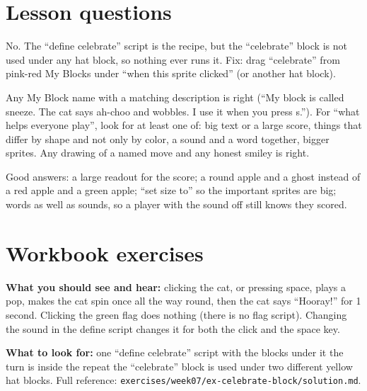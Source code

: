 
\section{Lesson questions}
\begin{answer}
No. The \enquote{define celebrate} script is the recipe, but the \enquote{celebrate} block is not used under any hat block, so nothing ever runs it. Fix: drag \enquote{celebrate} from pink-red My Blocks under \enquote{when this sprite clicked} (or another hat block).
\end{answer}

\begin{answer}[Reflection]
Any My Block name with a matching description is right (\enquote{My block is called sneeze. The cat says ah-choo and wobbles. I use it when you press s.}). For \enquote{what helps everyone play}, look for at least one of: big text or a large score, things that differ by shape and not only by color, a sound and a word together, bigger sprites. Any drawing of a named move and any honest smiley is right.
\end{answer}

\begin{answer}
Good answers: a large readout for the score; a round apple and a ghost instead of a red apple and a green apple; \enquote{set size to} so the important sprites are big; words as well as sounds, so a player with the sound off still knows they scored.
\end{answer}

\section{Workbook exercises}
\begin{answer}
\textbf{What you should see and hear:} clicking the cat, or pressing space, plays a pop, makes the cat spin once all the way round, then the cat says \enquote{Hooray!} for 1 second. Clicking the green flag does nothing (there is no flag script). Changing the sound in the define script changes it for both the click and the space key.

\textbf{What to look for:} \tickbox{} one \enquote{define celebrate} script with the blocks under it \quad \tickbox{} the turn is inside the repeat \quad \tickbox{} the \enquote{celebrate} block is used under two different yellow hat blocks. Full reference: \texttt{exercises/week07/ex-celebrate-block/solution.md}.
\end{answer}

